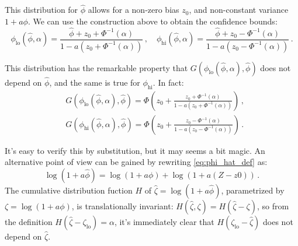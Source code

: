 \documentclass{article}
\begin{document}
This distribution for $\hat \phi$ allows for a non-zero bias $z_0$, and
non-constant variance $1 + a \phi$. We can use the construction above to obtain
the confidence bounds:
\begin{equation}
\phi_\mathrm{lo}(\hat\phi, \alpha) =
    \frac{\hat\phi + z_0 + \Phi^{-1}(\alpha)}
         {1 - a \left (z_0 + \Phi^{-1}(\alpha) \right)}\,,
\quad
\phi_\mathrm{hi}(\hat\phi, \alpha) =
    \frac{\hat\phi + z_0 - \Phi^{-1}(\alpha)}
         {1 - a \left(z_0 - \Phi^{-1}(\alpha)\right)}\,.
\end{equation}

This distribution has the remarkable property that
$G\left(\phi_\mathrm{lo}(\hat \phi, \alpha), \hat{\phi}\right)$ does not depend
on $\hat \phi$, and the same is true for $\phi_{\mathrm{hi}}$. In fact:
\begin{equation}\label{eq:G_phi_lo_phi_hat}
\begin{aligned}
&G\left(\phi_\mathrm{lo}(\hat \phi, \alpha), \hat{\phi}\right) =
    \Phi\left(z_0 + \frac{z_0 + \Phi^{-1}(\alpha)}
                         {1 - a \left (z_0 + \Phi^{-1}(\alpha) \right)}
        \right)\,, \\
&G\left(\phi_\mathrm{hi}(\hat \phi, \alpha), \hat{\phi}\right) =
    \Phi\left(z_0 + \frac{z_0 - \Phi^{-1}(\alpha)}
                         {1 - a \left (z_0 - \Phi^{-1}(\alpha) \right)}
        \right)\,.
\end{aligned}
\end{equation}

It's easy to verify this by substitution, but it may seems a bit magic. An
alternative point of view can be gained by rewriting \eqref{eq:phi_hat_def} as:
\begin{equation}
\log (1 + a \hat \phi) = \log(1 + a \phi) + \log\left(1 + a (Z - z0)\right)\,.
\end{equation}
The cumulative distribution fuction $H$ of $\hat \zeta = \log(1 + a \hat
\phi)$, parametrized by $\zeta = \log(1 + a \phi)$, is translationally
invariant: $H(\hat \zeta, \zeta) = H(\hat \zeta - \zeta)$, so from the
definition $H(\hat \zeta - \zeta_\mathrm{lo}) = \alpha$, it's immediately clear
that $H(\zeta_\mathrm{lo}
- \hat \zeta)$ does not depend on $\hat \zeta$.
\end{document}
